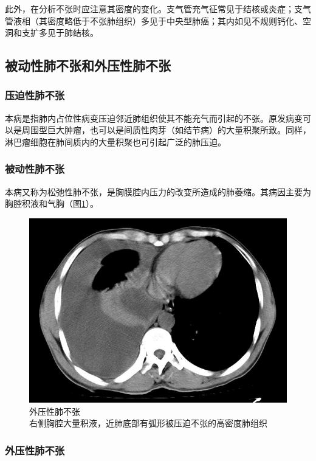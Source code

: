 此外，在分析不张时应注意其密度的变化。支气管充气征常见于结核或炎症；支气管液相（其密度略低于不张肺组织）多见于中央型肺癌；其内如见不规则钙化、空洞和支扩多见于肺结核。

\subsection{被动性肺不张和外压性肺不张}

\subsubsection{压迫性肺不张}

本病是指肺内占位性病变压迫邻近肺组织使其不能充气而引起的不张。原发病变可以是周围型巨大肿瘤，也可以是间质性肉芽（如结节病）的大量积聚所致。同样，淋巴瘤细胞在肺间质内的大量积聚也可引起广泛的肺压迫。

\subsubsection{被动性肺不张}

本病又称为松弛性肺不张，是胸膜腔内压力的改变所造成的肺萎缩。其病因主要为胸腔积液和气胸（图\ref{fig9-10}）。

\begin{figure}[!htbp]
 \centering
 \includegraphics[width=.7\textwidth,height=\textheight,keepaspectratio]{./images/Image00194.jpg}
 \captionsetup{justification=centering}
 \caption{外压性肺不张\\{\small 右侧胸腔大量积液，近肺底部有弧形被压迫不张的高密度肺组织}}
 \label{fig9-10}
  \end{figure} 

\subsubsection{外压性肺不张}

